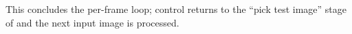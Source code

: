 This concludes the per-frame loop; control returns to the
``pick test image'' stage of  and the next input
image is processed.

